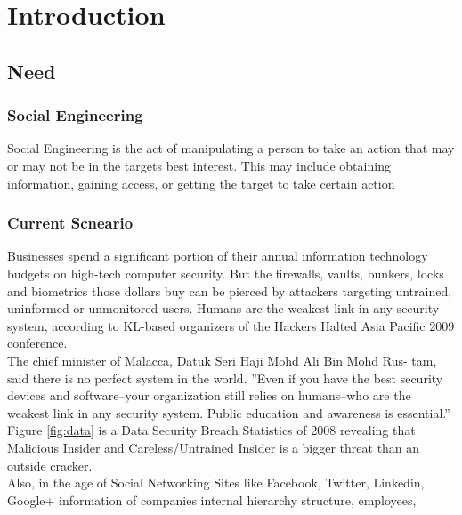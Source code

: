 


\chapter{Introduction}

\section{Need}

\subsection{Social Engineering}
Social Engineering is the act of manipulating a person to take an action that
may or may not be in the targets best interest. This may include obtaining
information, gaining access, or getting the target to take certain action\cite{book_se}

\subsection{Current Scneario}
Businesses spend a significant portion of their annual information technology
budgets on high-tech computer security. But the firewalls, vaults, bunkers,
locks and biometrics those dollars buy can be pierced by attackers targeting
untrained, uninformed or unmonitored users. Humans are the weakest link in
any security system, according to KL-based organizers of the Hackers Halted
Asia Pacific 2009 conference.\cite{link_humanweak}\\[0.5cm]
The chief minister of Malacca, Datuk Seri Haji Mohd Ali Bin Mohd Rus-
tam, said there is no perfect system in the world. ”Even if you have the best
security devices and software–your organization still relies on humans–who
are the weakest link in any security system. Public education and awareness
is essential.”\\[0.5cm]
Figure \ref{fig:data} is a Data Security Breach Statistics of 2008 revealing that
Malicious Insider and Careless/Untrained Insider is a bigger threat than an
outside cracker.\\[0.5cm]
Also, in the age of Social Networking Sites like Facebook, Twitter, Linkedin,
Google+ information of companies internal hierarchy structure, employees,

